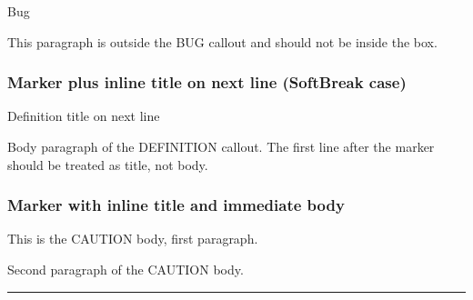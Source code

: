 \vspace{2mm}

\noindent\begin{tcolorbox}[colback=ocRed2Back,colframe=ocRed2Frame,coltitle=ocRed2Title,left=3mm,width=\linewidth,boxrule=0pt]

\hspace*{-2.5mm}\iconBug\; Bug

\end{tcolorbox}

This paragraph is outside the BUG callout and should not be inside the
box.

\subsubsection{Marker plus inline title on next line (SoftBreak
case)}\label{inner-1-marker-plus-inline-title-on-next-line-softbreak-case}

\begin{tcolorbox}[breakable,colback=ocPinBack,colframe=ocPinFrame,coltitle=ocPinTitle,left=3mm,boxed title style={left=1mm},title={\hspace*{-2.5mm}\iconDefinition\; Definition}]

Definition title on next line

Body paragraph of the DEFINITION callout. The first line after the
marker should be treated as title, not body.

\end{tcolorbox}

\subsubsection{Marker with inline title and immediate
body}\label{inner-1-marker-with-inline-title-and-immediate-body}

\begin{tcolorbox}[breakable,colback=ocOrgBack,colframe=ocOrgFrame,coltitle=ocOrgTitle,left=3mm,boxed title style={left=1mm},title={\hspace*{-2.5mm}\iconWarning\; Caution title}]

This is the CAUTION body, first paragraph.

Second paragraph of the CAUTION body.

\end{tcolorbox}

\begin{center}\rule{0.5\linewidth}{0.5pt}\end{center}

